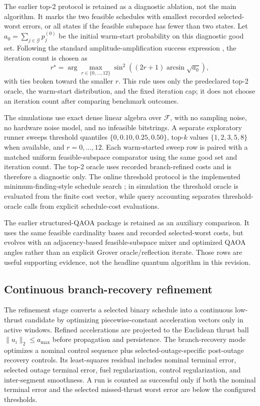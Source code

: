 \documentclass[preprint,12pt]{elsarticle}
\begin{document}
The earlier top-2 protocol is retained as a diagnostic ablation, not the main algorithm. It marks the two feasible schedules with smallest recorded selected-worst errors, or all states if the feasible subspace has fewer than two states. Let $a_0=\sum_{j\in\mathcal{G}}p_j^{(0)}$ be the initial warm-start probability on this diagnostic good set. Following the standard amplitude-amplification success expression \cite{grover1996fast,boyer1998tight,brassard2002amplitude}, the iteration count is chosen as
\begin{equation}
r^\star=\arg\max_{r\in\{0,\ldots,12\}}\sin^2\!\left((2r+1)\arcsin\sqrt{a_0}\right),
\end{equation}
with ties broken toward the smaller $r$. This rule uses only the predeclared top-2 oracle, the warm-start distribution, and the fixed iteration cap; it does not choose an iteration count after comparing benchmark outcomes.

The simulations use exact dense linear algebra over $\mathcal{F}$, with no sampling noise, no hardware noise model, and no infeasible bitstrings. A separate exploratory runner sweeps threshold quantiles $\{0,0.10,0.25,0.50\}$, top-$k$ values $\{1,2,3,5,8\}$ when available, and $r=0,\ldots,12$. Each warm-started sweep row is paired with a matched uniform feasible-subspace comparator using the same good set and iteration count. The top-2 oracle uses recorded branch-refined costs and is therefore a diagnostic only. The online threshold protocol is the implemented minimum-finding-style schedule search \cite{durr1996minimum}; in simulation the threshold oracle is evaluated from the finite cost vector, while query accounting separates threshold-oracle calls from explicit schedule-cost evaluations.

The earlier structured-QAOA package is retained as an auxiliary comparison. It uses the same feasible cardinality bases and recorded selected-worst costs, but evolves with an adjacency-based feasible-subspace mixer and optimized QAOA angles rather than an explicit Grover oracle/reflection iterate. Those rows are useful supporting evidence, not the headline quantum algorithm in this revision.

\subsection{Continuous branch-recovery refinement}

The refinement stage converts a selected binary schedule into a continuous low-thrust candidate by optimizing piecewise-constant acceleration vectors only in active windows. Refined accelerations are projected to the Euclidean thrust ball $\|u_i\|_2\leq a_{\max}$ before propagation and persistence. The branch-recovery mode optimizes a nominal control sequence plus selected-outage-specific post-outage recovery controls. Its least-squares residual includes nominal terminal error, selected outage terminal error, fuel regularization, control regularization, and inter-segment smoothness. A run is counted as successful only if both the nominal terminal error and the selected missed-thrust worst error are below the configured thresholds.
\end{document}
